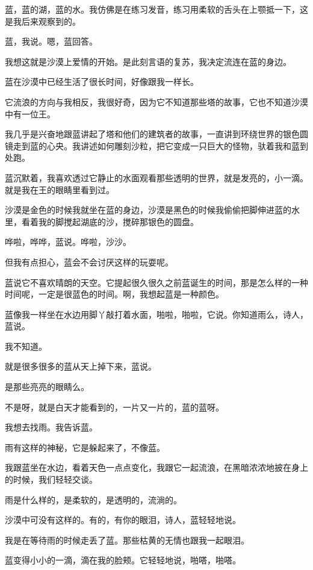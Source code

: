 \documentclass[UTF8]{article}
\begin{document}
\par 蓝，蓝的湖，蓝的水。我仿佛是在练习发音，练习用柔软的舌头在上颚抵一下，这是我后来观察到的。
\par 蓝，我说。嗯，蓝回答。
\par 我想这就是沙漠上爱情的开始。是此刻言语的复苏，我决定流连在蓝的身边。
\\[0.6cm]
\par 蓝在沙漠中已经生活了很长时间，好像跟我一样长。
\par 它流浪的方向与我相反，我很好奇，因为它不知道那些塔的故事，它也不知道沙漠中有一位王。
\par 我几乎是兴奋地跟蓝讲起了塔和他们的建筑者的故事，一直讲到环绕世界的银色圆镜走到蓝的心央。我讲述如何雕刻沙粒，把它变成一只巨大的怪物，驮着我和蓝到处跑。
\par 蓝沉默着，我喜欢透过它静止的水面观看那些透明的世界，就是发亮的，小一滴。就是我在王的眼睛里看到过。
\par 沙漠是金色的时候我就坐在蓝的身边，沙漠是黑色的时候我偷偷把脚伸进蓝的水里，看着我的脚搅起湖底的沙，搅碎那银色的圆盘。
\par 哗啦，哗哗，蓝说。哗啦，沙沙。
\par 但我有点担心，蓝会不会讨厌这样的玩耍呢。
\par 蓝说它不喜欢晴朗的天空。它提起很久很久之前蓝诞生的时间，那是怎么样的一种时间呢，一定是很蓝色的时间。啊，我想起蓝是一种颜色。
\par 蓝像我一样坐在水边用脚丫敲打着水面，啪啦，啪啦，它说。你知道雨么，诗人，蓝说。
\par 我不知道。
\par 就是很多很多的蓝从天上掉下来，蓝说。
\par 是那些亮亮的眼睛么。
\par 不是呀，就是白天才能看到的，一片又一片的，蓝的蓝呀。
\\[0.6cm]
\par 我想去找雨。我告诉蓝。
\par 雨有这样的神秘，它是躲起来了，不像蓝。
\par 我跟蓝坐在水边，看着天色一点点变化，我跟它一起流浪，在黑暗浓浓地披在身上的时候，我们轻轻交谈。
\par 雨是什么样的，是柔软的，是透明的，流淌的。
\par 沙漠中可没有这样的。有的，有你的眼泪，诗人，蓝轻轻地说。
\\[0.6cm]
\par 我是在等待雨的时候走丢了蓝。那些枯黄的无情也跟我一起眼泪。
\par 蓝变得小小的一滴，滴在我的脸颊。它轻轻地说，啪嗒，啪嗒。
\end{document}
